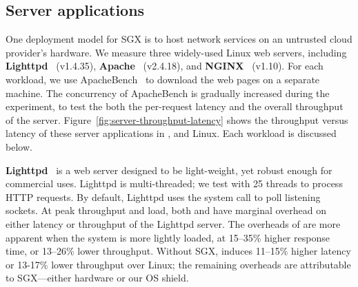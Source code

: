 
\subsection{Server applications}

One deployment model for SGX is to host network services
on an untrusted cloud provider's hardware.
We measure three widely-used Linux web servers, including {\bf Lighttpd}~\cite{lighttpd} (v1.4.35), {\bf Apache}~\cite{apache} (v2.4.18), and {\bf NGINX}~\cite{nginx} (v1.10).
For each workload, we use ApacheBench~\cite{apachebench} to download the web pages on a separate machine.
The concurrency of ApacheBench is gradually increased during the experiment, to test the both the per-request latency and the overall throughput of the server.
Figure~\ref{fig:server-throughput-latency} shows the throughput versus latency of these server applications
in \graphenesgx{}, \graphene{} and Linux. 
Each workload is discussed below.

{\bf Lighttpd}~\cite{lighttpd} is a web server designed to be light-weight, yet robust enough for commercial uses. 
Lighttpd is multi-threaded; we test with 25 threads to process HTTP requests. 
By default, Lighttpd uses the  system call to poll listening sockets.
At peak throughput and load,  both \graphene{} and \graphenesgx{} have marginal overhead on either latency or throughput of the Lighttpd server.
The overheads of \graphene{} are more apparent when the system
is more lightly loaded, at 
15--35\% higher response time, or 13--26\% lower throughput. 
Without SGX, \graphene{} induces 
11--15\% higher latency or 13-17\% lower throughput over Linux;
the remaining overheads are attributable to SGX---either hardware or our OS shield.

